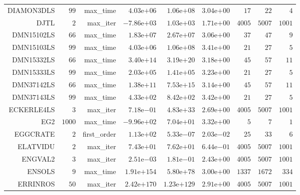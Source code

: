 \begin{longtable}{rrrrrrrrr}
DIAMON3DLS & \(    99\) & max\_time & \( 4.03\)e\(+06\) & \( 1.06\)e\(+08\) & \( 3.04\)e\(+00\) & \(    17\) & \(    22\) & \(     4\) \\
DJTL & \(     2\) & max\_iter & \(-7.86\)e\(+03\) & \( 1.03\)e\(+03\) & \( 1.71\)e\(+00\) & \(  4005\) & \(  5007\) & \(  1001\) \\
DMN15102LS & \(    66\) & max\_time & \( 1.83\)e\(+07\) & \( 2.67\)e\(+07\) & \( 3.06\)e\(+00\) & \(    37\) & \(    47\) & \(     9\) \\
DMN15103LS & \(    99\) & max\_time & \( 4.03\)e\(+06\) & \( 1.06\)e\(+08\) & \( 3.41\)e\(+00\) & \(    21\) & \(    27\) & \(     5\) \\
DMN15332LS & \(    66\) & max\_time & \( 3.40\)e\(+14\) & \( 3.19\)e\(+20\) & \( 3.18\)e\(+00\) & \(    45\) & \(    57\) & \(    11\) \\
DMN15333LS & \(    99\) & max\_time & \( 2.03\)e\(+05\) & \( 1.41\)e\(+05\) & \( 3.23\)e\(+00\) & \(    21\) & \(    27\) & \(     5\) \\
DMN37142LS & \(    66\) & max\_time & \( 1.38\)e\(+11\) & \( 7.53\)e\(+15\) & \( 3.14\)e\(+00\) & \(    45\) & \(    57\) & \(    11\) \\
DMN37143LS & \(    99\) & max\_time & \( 4.33\)e\(+02\) & \( 8.42\)e\(+02\) & \( 3.42\)e\(+00\) & \(    21\) & \(    27\) & \(     5\) \\
ECKERLE4LS & \(     3\) & max\_iter & \( 7.18\)e\(-01\) & \( 4.83\)e\(+33\) & \( 2.69\)e\(+00\) & \(  4005\) & \(  5007\) & \(  1001\) \\
EG2 & \(  1000\) & max\_time & \(-9.96\)e\(+02\) & \( 7.04\)e\(+01\) & \( 3.32\)e\(+00\) & \(     5\) & \(     7\) & \(     1\) \\
EGGCRATE & \(     2\) & first\_order & \( 1.13\)e\(+02\) & \( 5.33\)e\(-07\) & \( 2.03\)e\(-02\) & \(    25\) & \(    33\) & \(     6\) \\
ELATVIDU & \(     2\) & max\_iter & \( 7.43\)e\(+01\) & \( 7.62\)e\(+01\) & \( 6.44\)e\(-01\) & \(  4005\) & \(  5007\) & \(  1001\) \\
ENGVAL2 & \(     3\) & max\_iter & \( 2.51\)e\(-03\) & \( 1.81\)e\(-01\) & \( 2.43\)e\(+00\) & \(  4005\) & \(  5007\) & \(  1001\) \\
ENSOLS & \(     9\) & max\_time & \(1.91\)e\(+154\) & \( 5.80\)e\(+78\) & \( 3.00\)e\(+00\) & \(  1337\) & \(  1672\) & \(   334\) \\
ERRINROS & \(    50\) & max\_iter & \(2.42\)e\(+170\) & \(1.23\)e\(+129\) & \( 2.91\)e\(+00\) & \(  4005\) & \(  5007\) & \(  1001\) \\

\end{longtable}
